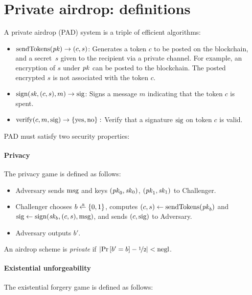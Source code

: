 \section{Private airdrop: definitions}\label{sec:defs}

A private airdrop (PAD) system is a triple of efficient algorithms:
\begin{itemize}
\item $\text{sendTokens}(\mathit{pk}) \to (c, s)$:
Generates a token $c$ to be posted on the blockchain,
and a secret~$s$ given to the recipient via a private channel.
For example, an encryption of $s$ under $\mathit{pk}$ can be posted
to the blockchain.   The posted encrypted $s$ is not associated with 
the token $c$. 

\item $\text{sign}(\mathit{sk}, (c, s), m) \to \text{sig}$:
Signs a message $m$ indicating that the token $c$ is spent.

\item $\text{verify}(c, m, \text{sig}) \to \{\text{yes},\text{no}\}:$
Verify that a signature $\text{sig}$ on token $c$ is valid.
\end{itemize}

 PAD must satisfy two security properties:

\paragraph{Privacy}
The privacy game
is defined as follows:

\begin{itemize}
\item Adversary sends $\text{msg}$ and keys $(\mathit{pk}_0, \mathit{sk}_0)$, $(\mathit{pk}_1, \mathit{sk}_1)$ to Challenger.

\item Challenger chooses $b \rgets \{0,1\}$,
computes $(c, s) \gets \text{sendTokens}(\mathit{pk}_b)$ and
$\text{sig} \gets \text{sign}(\mathit{sk}_b, (c, s), \text{msg})$,
and sends $(c, \text{sig})$ to Adversary.

\item Adversary outputs $b'$.

\end{itemize}
An airdrop scheme is \emph{private} if $\left|{\operatorname*{Pr}\left[{b' = b}\right] - \nicefrac{1}{2}}\right| < \text{negl}$.


\paragraph{Existential unforgeability}
The existential forgery game is defined as follows:

